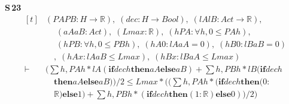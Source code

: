 \noindent\textbf{S\,23}\quad{}
{\footnotesize\[ \begin{aligned}[t]
&(\mathit{PA} \mathit{PB} : \mathit{H} \to \mathbb{R} ),\; (\mathit{dec} : \mathit{H} \to \mathit{Bool}),\; (\mathit{lA} \mathit{lB} : \mathit{Act} \to \mathbb{R} ),\\
&\quad \; (\mathit{aA} \mathit{aB} : \mathit{Act}),\; (\mathit{Lmax} : \mathbb{R} ),\; (\mathit{hPA} : \forall \mathit{h}, 0 \leq \mathit{PA} \mathit{h}),\\
&\quad \; (\mathit{hPB} : \forall \mathit{h}, 0 \leq \mathit{PB} \mathit{h}),\; (\mathit{hA0} : \mathit{lA} \mathit{aA} = 0),\; (\mathit{hB0} : \mathit{lB} \mathit{aB} = 0)\\
&\quad ,\; (\mathit{hAx} : \mathit{lA} \mathit{aB} \leq \mathit{Lmax}),\; (\mathit{hBx} : \mathit{lB} \mathit{aA} \leq \mathit{Lmax})\\
\vdash\;&(\textstyle\sum \mathit{h}, \mathit{PA} \mathit{h} * \mathit{lA} (\mathbf{if} \mathit{dec} \mathit{h} \mathbf{then} \mathit{aA} \mathbf{else} \mathit{aB}) + \textstyle\sum \mathit{h}, \mathit{PB} \mathit{h} * \mathit{lB} (\mathbf{if} \mathit{dec} \mathit{h}\\
&\quad \mathbf{then} \mathit{aA} \mathbf{else} \mathit{aB})) / 2 \leq \mathit{Lmax} * ((\textstyle\sum \mathit{h}, \mathit{PA} \mathit{h} * (\mathbf{if} \mathit{dec} \mathit{h} \mathbf{then} (0:\\
&\quad \mathbb{R} ) \mathbf{else} 1) + \textstyle\sum \mathit{h}, \mathit{PB} \mathit{h} * (\mathbf{if} \mathit{dec} \mathit{h} \mathbf{then} (1:\mathbb{R} ) \mathbf{else} 0)) / 2)
\end{aligned} \]}

